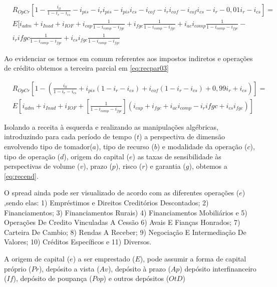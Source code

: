 \documentclass[
  12pt,
  12pt,
  openright,
  oneside,
  a4paper,
  chapter=TITLE,
  section=TITLE,
  subsection=TITLE,
  subsubsection=TITLE,
  english,
  portugues,
  sumario=tradicional]{abntex2}
\begin{document}
\begin{apendicesenv}
\begin{equation}\label{eq:recpar02}
\begin{aligned}
& R_{OpCr}[1 - \frac{i_{ll}}{1 - i_{r} - i_{cs}} - i_{pis} - i_{r}i_{pis} - i_{pis}i_{cs} - i_{cof} - i_{r}i_{cof} - i_{cof}i_{cs} - i_{r} - 0,01i_{r} - i_{cs}] = \\
& E[i_{adm} + i_{Inad} + i_{IOF} +  i_{cap}\frac{1}{1 - i_{comp} - i_{fgc}} + i_{fgc}\frac{1}{1 - i_{comp} - i_{fgc}} + i_{ac}i_{comp}\frac{1}{1 - i_{comp} - i_{fgc}} - \\
& i_{r}i{fgc}\frac{1}{1 - i_{comp} - i_{fgc}} + i_{cs}i_{fgc}\frac{1}{1 - i_{comp} - i_{fgc}}
\end{aligned}
\end{equation}


Ao evidenciar os termos em comum referentes aos impostos indiretos e operações de crédito obtemos a terceira parcial em \autoref{eq:recpar03}


\begin{equation}\label{eq:recpar03}
\begin{aligned}
& R_{OpCr}[1 - (\frac{i_{ll}}{1 - i_{r} - i_{cs}} + i_{pis}(1 - i_{r} - i_{cs}) + i_{cof}(1 - i_{r} - i_{cs}) + 0,99i_{r} + i_{cs})] = \\
& E[i_{adm} + i_{Inad} + i_{IOF} +  [\frac{1}{1 - i_{comp} - i_{fgc}}] (i_{cap} + i_{fgc} + i_{ac}i_{comp} - i_{r}i{fgc}+ i_{cs}i_{fgc})]
\end{aligned}
\end{equation}


Isolando a receita à esquerda e realizando as manipulações algébricas, introduzindo para cada período de tempo ($t$) a perspectiva de dimensão envolvendo tipo de tomador($a$), tipo de recurso ($b$) e modalidade da operação ($c$), tipo de operação ($d$), origem do capital ($e$) as taxas de sensibilidade às perspectivas de volume ($v$), prazo ($p$), risco ($r$) e garantia ($g$), obtemos a \autoref{eq:recend}.

O spread ainda pode ser visualizado de acordo com as diferentes operações ($e$)  ,sendo elas: 1) Empréstimos e Direitos Creditórios Descontados; 2) Financiamentos; 3) Financiamentos Rurais) 4) Financiamentos Mobiliários e 
5) Operações De Credito Vinculadas A Cessão 6) Avais E Fianças Honrados; 7) Carteira De Cambio; 8) Rendas A Receber; 9) Negociação E Intermediação De Valores; 10) Créditos Específicos e 11) Diversos.

A origem de capital ($e$) a ser emprestado ($E$), pode assumir a forma de capital próprio ($Pr$), depósito a vista ($Av$), depósito à prazo ($Ap$) depósito interfinanceiro ($If$), depósito de poupança ($Pop$) e outros depósitos ($OtD$)



\end{apendicesenv}
\end{document}
